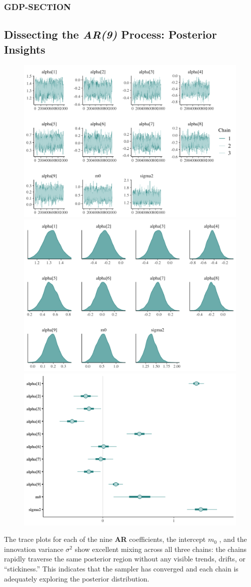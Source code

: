 \documentclass{Configuration_Files/PoliMi3i_thesis}
\begin{document}
\subsubsection{GDP-SECTION}
\subsection{Dissecting the \textbf{\textit{AR(9)}} Process: Posterior Insights}
\begin{figure}[H]
    \centering
    \includegraphics[width=0.47\linewidth]{AR(9)_trace.png}
    \vspace{0.5em}
    
    \includegraphics[width=0.47\linewidth]{AR(9)_Density.png}
    \vspace{0.5em}
    
    \includegraphics[width=0.47\linewidth]{AR(9)_interval.png}
\end{figure}


The trace plots for each of the nine \textbf{\textbf{AR}} coefficients, the intercept \(m_0\) , and the innovation variance \(\sigma^2\) show excellent mixing across all three chains: the chains rapidly traverse the same posterior region without any visible trends, drifts, or “stickiness.” This indicates that the sampler has converged and each chain is adequately exploring the posterior distribution.
\end{document}

